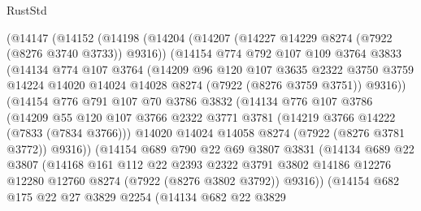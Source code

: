 \begin{lexlean}{RustStd}
\begin{coremodule}
      (@14147
        (@14152
          (@14198
            (@14204
              (@14207 (@14227 @14229 @8274 (@7922 (@8276 @3740 @3733)) @9316))
              (@14154
                @774
                @792
                @107
                @109
                @3764
                @3833
                (@14134
                  @774
                  @107
                  @3764
                  (@14209
                    @96
                    @120
                    @107
                    @3635
                    @2322
                    @3750
                    @3759
                    @14224
                    @14020
                    @14024
                    @14028
                    @8274
                    (@7922 (@8276 @3759 @3751))
                    @9316))
                (@14154
                  @776
                  @791
                  @107
                  @70
                  @3786
                  @3832
                  (@14134
                    @776
                    @107
                    @3786
                    (@14209
                      @55
                      @120
                      @107
                      @3766
                      @2322
                      @3771
                      @3781
                      (@14219 @3766 @14222 (@7833 (@7834 @3766)))
                      @14020
                      @14024
                      @14058
                      @8274
                      (@7922 (@8276 @3781 @3772))
                      @9316))
                  (@14154
                    @689
                    @790
                    @22
                    @69
                    @3807
                    @3831
                    (@14134
                      @689
                      @22
                      @3807
                      (@14168
                        @161
                        @112
                        @22
                        @2393
                        @2322
                        @3791
                        @3802
                        @14186
                        @12276
                        @12280
                        @12760
                        @8274
                        (@7922 (@8276 @3802 @3792))
                        @9316))
                    (@14154
                      @682
                      @175
                      @22
                      @27
                      @3829
                      @2254
                      (@14134
                        @682
                        @22
                        @3829

\end{coremodule}
\end{lexlean}
